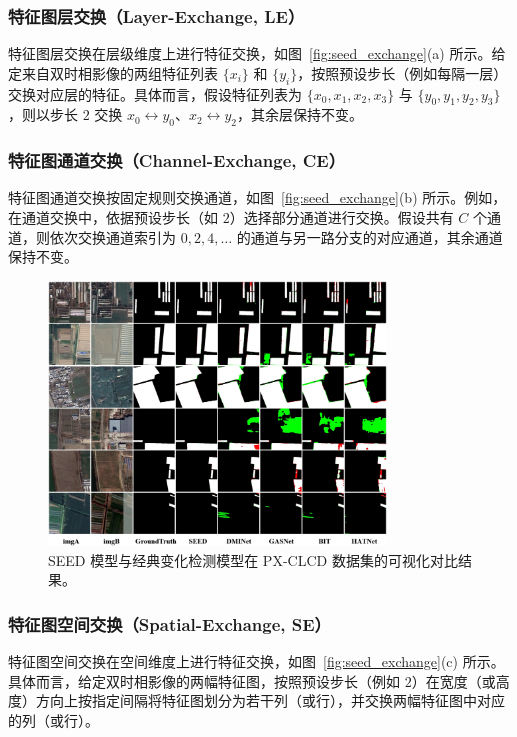\subsubsection{特征图层交换（Layer-Exchange, LE）}
特征图层交换在层级维度上进行特征交换，如图~\ref{fig:seed_exchange}(a) 所示。给定来自双时相影像的两组特征列表 \(\{x_i\}\) 和 \(\{y_i\}\)，按照预设步长（例如每隔一层）交换对应层的特征。具体而言，假设特征列表为 \(\{x_0, x_1, x_2, x_3\}\) 与 \(\{y_0, y_1, y_2, y_3\}\)，则以步长 \(2\) 交换 \(x_0 \leftrightarrow y_0\)、\(x_2 \leftrightarrow y_2\)，其余层保持不变。

\subsubsection{特征图通道交换（Channel-Exchange, CE）} 
特征图通道交换按固定规则交换通道，如图~\ref{fig:seed_exchange}(b) 所示。例如，在通道交换中，依据预设步长（如 $2$）选择部分通道进行交换。假设共有 $C$ 个通道，则依次交换通道索引为 $0,2,4,\ldots$ 的通道与另一路分支的对应通道，其余通道保持不变。


\begin{figure}[!htbp]
  \centering
  \includegraphics[width=0.8\textwidth]{paper_figures/变化检测任务基础范式设计/seed_pxclcd.png}
  \caption{SEED 模型与经典变化检测模型在 PX-CLCD 数据集的可视化对比结果。}
  \label{fig:seed_pxclcd}
\end{figure}

\subsubsection{特征图空间交换（Spatial-Exchange, SE）}
特征图空间交换在空间维度上进行特征交换，如图~\ref{fig:seed_exchange}(c) 所示。具体而言，给定双时相影像的两幅特征图，按照预设步长（例如 $2$）在宽度（或高度）方向上按指定间隔将特征图划分为若干列（或行），并交换两幅特征图中对应的列（或行）。


